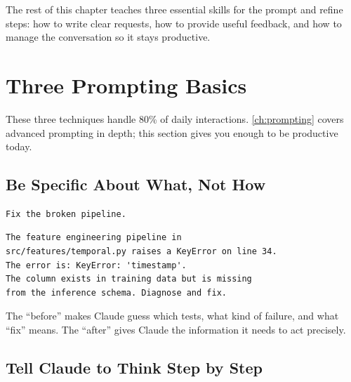 


The rest of this chapter teaches three essential skills for the prompt
and refine steps: how to write clear requests, how to provide useful feedback,
and how to manage the conversation so it stays productive.

\section{Three Prompting Basics}
\label{sec:prompting-basics}

These three techniques handle 80\% of daily interactions.
\cref{ch:prompting} covers advanced prompting in depth;
this section gives you enough to be productive today.

\subsection{Be Specific About What, Not How}

\begin{fullwidth}
\begin{beforeafter}
\before
\begin{verbatim}
Fix the broken pipeline.
\end{verbatim}

\after
\begin{verbatim}
The feature engineering pipeline in
src/features/temporal.py raises a KeyError on line 34.
The error is: KeyError: 'timestamp'.
The column exists in training data but is missing
from the inference schema. Diagnose and fix.
\end{verbatim}
\end{beforeafter}
\end{fullwidth}

The ``before'' makes Claude guess which tests, what kind of failure,
and what ``fix'' means. The ``after'' gives Claude the information
it needs to act precisely.

\subsection{Tell Claude to Think Step by Step}

